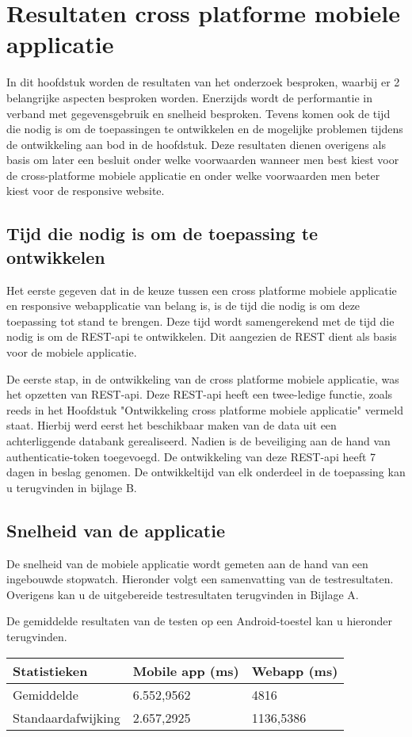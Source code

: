 \chapter{Resultaten cross platforme mobiele applicatie}
\label{ch:resultatencrossplatformapp}
In dit hoofdstuk worden de resultaten van het onderzoek besproken, waarbij er 2 belangrijke
aspecten besproken worden.
Enerzijds wordt de performantie in verband met gegevensgebruik en  snelheid besproken.
Tevens komen ook de tijd die nodig is om de toepassingen te ontwikkelen en de mogelijke
problemen tijdens de ontwikkeling aan bod in de hoofdstuk.
Deze resultaten dienen overigens als basis om later een besluit onder welke
voorwaarden wanneer men best kiest voor de
cross-platforme mobiele applicatie en onder welke voorwaarden men beter kiest voor de responsive website.

\section{Tijd die nodig is om de toepassing te ontwikkelen}
Het eerste gegeven dat in de keuze tussen een cross platforme mobiele
applicatie en responsive webapplicatie van belang is,
is de tijd die nodig is om deze toepassing tot stand te brengen.
Deze tijd wordt samengerekend met de tijd die nodig is om de
REST-api te ontwikkelen. Dit aangezien de REST dient als basis voor de mobiele applicatie.

De eerste stap, in de ontwikkeling van de cross platforme mobiele applicatie, was het opzetten van REST-api.
Deze REST-api heeft een twee-ledige functie, zoals reeds in het Hoofdstuk "Ontwikkeling cross platforme mobiele applicatie" vermeld staat.
Hierbij werd eerst het beschikbaar maken van de data uit een achterliggende databank gerealiseerd. Nadien is de beveiliging aan de hand
van authenticatie-token toegevoegd. De ontwikkeling van deze REST-api heeft 7 dagen in beslag genomen. De ontwikkeltijd van elk onderdeel
in de toepassing kan u terugvinden in bijlage B.

\section{Snelheid van de applicatie}
De snelheid van de mobiele applicatie wordt gemeten aan de hand van een ingebouwde stopwatch.
Hieronder volgt een samenvatting van de testresultaten. Overigens kan u de uitgebereide testresultaten terugvinden in Bijlage A.

De gemiddelde resultaten van de testen op een Android-toestel kan u hieronder terugvinden.
\begin{center}
\begin{tabular}{| l | l | l | }
  \hline
  Statistieken & Mobile app (ms) & Webapp (ms) \\ \hline
  Gemiddelde & 6.552,9562 & 4816 \\ \hline
  Standaardafwijking & 2.657,2925 & 1136,5386 \\
  \hline
\end{tabular}
\end{center}


